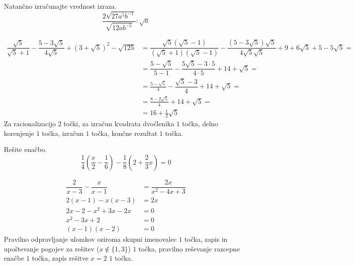 \documentclass[addpoints]{exam}
\begin{document}
\begin{questions}


    \question[5]
    Natančno izračunajte vrednost izraza.
    $$ \dfrac{2\sqrt{27a^5b^{-1}}}{\sqrt{12ab^{-5}}}:\sqrt{a} $$

    \begin{solution}[7cm]
        \begin{align*} 
            \dfrac{\sqrt{5}}{\sqrt{5}+1}-\dfrac{5-3\sqrt{5}}{4\sqrt{5}}+\left(3+\sqrt{5}\right)^2-\sqrt{125}&=\dfrac{\sqrt{5}(\sqrt{5}-1)}{(\sqrt{5}+1)(\sqrt{5}-1)}-\dfrac{(5-3\sqrt{5})\sqrt{5}}{4\sqrt{5}\sqrt{5}}+9+6\sqrt{5}+5-5\sqrt{5}= \\
                                                                                                            &=\dfrac{5-\sqrt{5}}{5-1}-\dfrac{5\sqrt{5}-3\cdot 5}{4\cdot 5}+14+\sqrt{5}= \\
                                                                                                            &=\frac{5-\sqrt{5}}{4}-\dfrac{\sqrt{5}-3}{4}+14+\sqrt{5}= \\
                                                                                                            &=\frac{8-2\sqrt{5}}{4}+14+\sqrt{5}= \\
                                                                                                            &=16+\frac{1}{2}\sqrt{5}
        \end{align*}
        Za racionalizacijo $2$ točki, za izračun kvadrata dvočlenika $1$ točka, delno korenjenje $1$ točka, izračun $1$ točka, končne rezultat $1$ točka.
    \end{solution}
    
    

    \question[3]
    Rešite enačbo.
    $$ \dfrac{1}{4}\left(\dfrac{x}{2}-\dfrac{1}{6}\right)-\dfrac{1}{8}\left(2+\dfrac{2}{3}x\right)=0 $$
    
    
    \begin{solution}[4cm]
        \begin{align*} 
            \dfrac{2}{x-3}-\dfrac{x}{x-1} &=\dfrac{2x}{x^2-4x+3} \\
            2(x-1)-x(x-3) &= 2x \\
            2x-2-x^2+3x-2x &=0 \\
            x^2-3x+2 &=0 \\
            (x-1)(x-2) &=0
        \end{align*}
        Pravilno odpravljanje ulomkov oziroma skupni imenovalec $1$ točka, zapis in upoštevanje pogojev za rešitev ($x\notin\{1,3\}$) $1$ točka, pravilno reševanje razcepne enačbe $1$ točka, zapis rešitve $x=2$ $1$ točka.
    \end{solution}


\end{questions}
\end{document}
